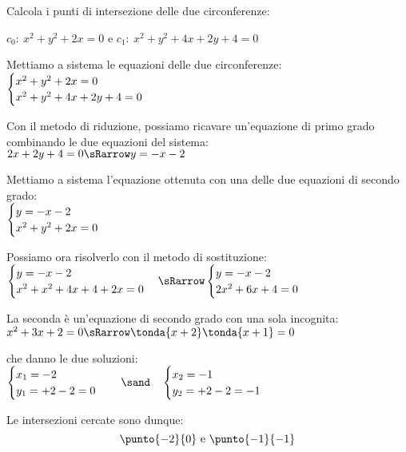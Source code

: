 \begin{esempio}
Calcola i punti di intersezione delle due circonferenze:

\(c_0:~x^2 + y^2 +2x = 0\) e \(c_1:~x^2 + y^2 +4x +2y +4 = 0\) 

Mettiamo a sistema le equazioni delle due circonferenze: \\
\(\begin{cases}x^2 + y^2 +2x = 0 \\x^2 + y^2 +4x +2y +4 = 0\end{cases}\) 

Con il metodo di riduzione, possiamo ricavare un'equazione di primo grado 
combinando le due equazioni del sistema: \\
\(2x +2y +4 = 0 \sRarrow y = -x -2\)

Mettiamo a sistema l'equazione ottenuta con una delle due 
equazioni di secondo grado: \\
\(\begin{cases}y = -x -2 \\ x^2 + y^2 +2x = 0\end{cases}\) 

Possiamo ora risolverlo con il metodo di sostituzione: \\
\(\sistema{y = -x -2 \\ x^2 + x^2 +4x +4 +2x = 0} \sRarrow
  \sistema{y = -x -2 \\ 2x^2 +6x +4 = 0}\) 
  
La seconda è un'equazione di secondo grado con una sola incognita: \\
\(x^2 +3x +2 = 0 \sRarrow \tonda{x +2} \tonda{x +1} = 0\) 

che danno le due soluzioni: \\
\(\sistema{x_1 = -2 \\ y_1 = +2 -2 = 0 } \quad \sand \quad
  \sistema{x_2 = -1 \\ y_2 = +2 -2 = -1 }\)
  
Le intersezioni cercate sono dunque: 
\[\punto{-2}{0} \text{ e } \punto{-1}{-1}\]
\end{esempio}





